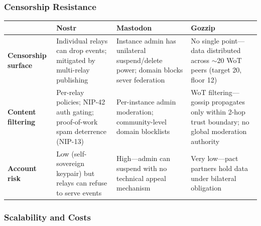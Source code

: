 \documentclass[11pt,a4paper]{article}
\begin{document}
\subsubsection*{Censorship Resistance}

\begin{table}[H]
\centering
\small
\begin{tabularx}{\textwidth}{lXXX}
\toprule
 & \textbf{Nostr} & \textbf{Mastodon} & \textbf{Gozzip} \\
\midrule
\textbf{Censorship surface} & Individual relays can drop events; mitigated by multi-relay publishing & Instance admin has unilateral suspend/delete power; domain blocks sever federation & No single point---data distributed across ${\sim}20$ WoT peers (target 20, floor 12) \\
\textbf{Content filtering} & Per-relay policies; NIP-42 auth gating; proof-of-work spam deterrence (NIP-13) & Per-instance admin moderation; community-level domain blocklists & WoT filtering---gossip propagates only within 2-hop trust boundary; no global moderation authority \\
\textbf{Account risk} & Low (self-sovereign keypair) but relays can refuse to serve events & High---admin can suspend with no technical appeal mechanism & Very low---pact partners hold data under bilateral obligation \\
\bottomrule
\end{tabularx}
\end{table}

\subsubsection*{Scalability and Costs}
\end{document}
